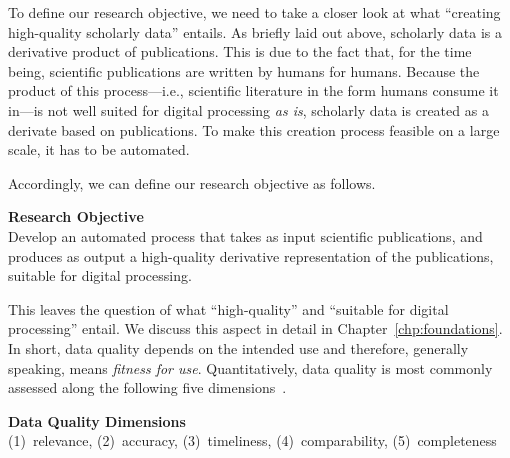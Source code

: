 
To define our research objective, we need to take a closer look at what ``creating high-quality scholarly data'' entails. As briefly laid out above, scholarly data is a derivative product of publications. This is due to the fact that, for the time being, scientific publications are written by humans for humans. Because the product of this process---i.e., scientific literature in the form humans consume it in---is not well suited for digital processing \emph{as is}, scholarly data is created as a derivate based on publications. To make this creation process feasible on a large scale, it has to be automated.

Accordingly, we can define our research objective as follows.

\begin{infobox-objective}
\textbf{Research Objective}\\
Develop an automated process that takes as input scientific publications, and produces as output a high-quality derivative representation of the publications, suitable for digital processing.
\end{infobox-objective}

This leaves the question of what ``high-quality'' and ``suitable for digital processing'' entail. We discuss this aspect in detail in Chapter~\ref{chp:foundations}. In short, data quality depends on the intended use and therefore, generally speaking, means \emph{fitness for use}. Quantitatively, data quality is most commonly assessed along the following five dimensions~\cite{Herzog2007}.

\begin{infobox-progress}
      \textbf{Data Quality Dimensions}\\
       (1)~relevance, (2)~accuracy, (3)~timeliness, (4)~comparability, (5)~completeness
\end{infobox-progress}


